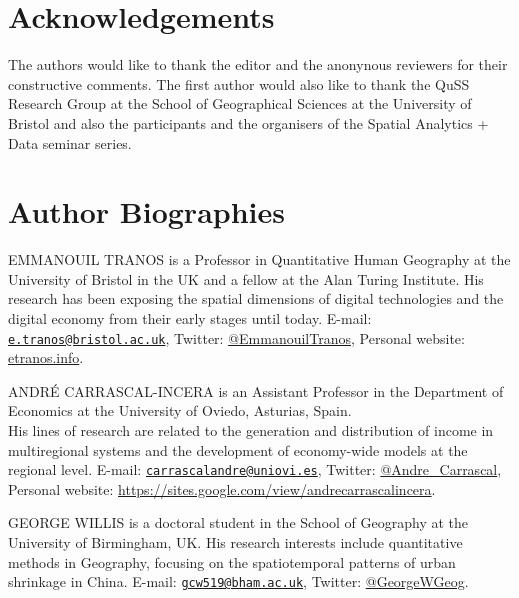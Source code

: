 \documentclass[]{interact}
\theoremstyle{plain}%
\theoremstyle{definition}
\theoremstyle{remark}
\begin{document}
\hypertarget{acknowledgements}{%
\section*{Acknowledgements}\label{acknowledgements}}

The authors would like to thank the editor and the anonynous reviewers
for their constructive comments. The first author would also like to
thank the QuSS Research Group at the School of Geographical Sciences at
the University of Bristol and also the participants and the organisers
of the Spatial Analytics + Data seminar series.

\hypertarget{author-biographies}{%
\section*{Author Biographies}\label{author-biographies}}

EMMANOUIL TRANOS is a Professor in Quantitative Human Geography at the
University of Bristol in the UK and a fellow at the Alan Turing
Institute. His research has been exposing the spatial dimensions of
digital technologies and the digital economy from their early stages
until today. E-mail:
\href{mailto:e.tranos@bristol.ac.uk}{\nolinkurl{e.tranos@bristol.ac.uk}},
Twitter: \href{https://twitter.com/EmmanouilTranos}{@EmmanouilTranos},
Personal website: \href{https://etranos.info/}{etranos.info}.

\bigskip

\noindent ANDRÉ CARRASCAL-INCERA is an Assistant Professor in the
Department of Economics at the University of Oviedo, Asturias, Spain.\\
His lines of research are related to the generation and distribution of
income in multiregional systems and the development of economy-wide
models at the regional level. E-mail:
\href{mailto:carrascalandre@uniovi.es}{\nolinkurl{carrascalandre@uniovi.es}},
Twitter: \href{https://twitter.com/Andre_Carrascal}{@Andre\_Carrascal},
Personal website:
\url{https://sites.google.com/view/andrecarrascalincera}.

\bigskip

\noindent GEORGE WILLIS is a doctoral student in the School of Geography
at the University of Birmingham, UK. His research interests include
quantitative methods in Geography, focusing on the spatiotemporal
patterns of urban shrinkage in China. E-mail:
\href{mailto:gcw519@bham.ac.uk}{\nolinkurl{gcw519@bham.ac.uk}}, Twitter:
\href{https://twitter.com/GeorgeWGeog}{@GeorgeWGeog}.



\end{document}
